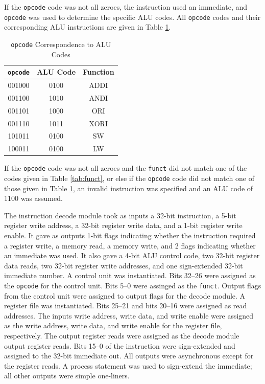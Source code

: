 \documentclass[CMPE]{KGCOEReport}
\begin{document}
\begin{table}[H]

	If the \texttt{opcode} code was not all zeroes, the instruction used an
	immediate, and \texttt{opcode} was used to determine the specific ALU
	codes. All \texttt{opcode} codes and their corresponding ALU instructions
	are given in Table \ref{tab:opcode}.

	\center
	\caption{\texttt{opcode} Correspondence to ALU Codes}
	\begin{tabular}{|c|c|c|}
		\hline
		\texttt{opcode} & ALU Code & Function \\
		\hline
		\hline
		001000          & 0100     & ADDI     \\
		\hline
		001100          & 1010     & ANDI     \\
		\hline
		001101          & 1000     & ORI      \\
		\hline
		001110          & 1011     & XORI     \\
		\hline
		101011          & 0100     & SW       \\
		\hline
		100011          & 0100     & LW       \\
		\hline
	\end{tabular}
	\label{tab:opcode}
\end{table}

If the \texttt{opcode} code was not all zeroes and the \texttt{funct} did not
match one of the codes given in Table \ref{tab:funct}, or else if the
\texttt{opcode} code did not match one of those given in Table
\ref{tab:opcode}, an invalid instruction was specified and an ALU code of 1100
was assumed.

The instruction decode module took as inputs a 32-bit instruction, a 5-bit
register write address, a 32-bit register write data, and a 1-bit register
write enable. It gave as outputs 1-bit flags indicating whether the instruction
required a register write, a memory read, a memory write, and 2 flags
indicating whether an immediate was used. It also gave a 4-bit ALU control
code, two 32-bit register data reads, two 32-bit register write addresses, and
one sign-extended 32-bit immediate number. A control unit was instantiated.
Bits 32--26 were assigned as the \texttt{opcode} for the control unit. Bits
5--0 were assinged as the \texttt{funct}. Output flags from the control unit
were assigned to output flags for the decode module. A register file was
instantiated. Bits 25--21 and bits 20--16 were assigned as read addresses. The
inputs write address, write data, and write enable were assigned as the write
address, write data, and write enable for the register file, respectively. The
output register reads were assigned as the decode module output register reads.
Bits 15--0 of the instruction were sign-extended and assigned to the 32-bit
immediate out. All outputs were asynchronous except for the register reads. A
process statement was used to sign-extend the immediate; all other outputs
were simple one-liners.
\end{document}
